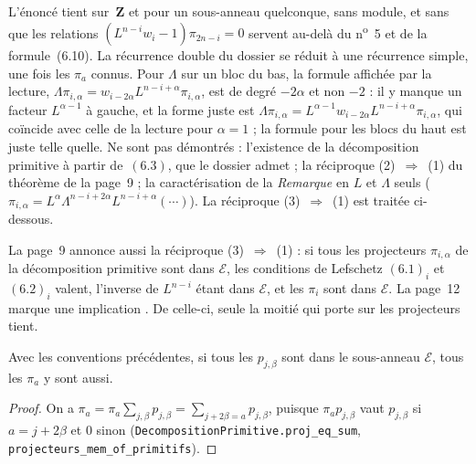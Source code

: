\begin{remarque}
L'énoncé tient sur~$\mathbf Z$ et pour un sous-anneau quelconque, sans module, et sans que les relations $(L^{n-i}w_i - 1)\pi_{2n-i} = 0$ servent au-delà du n\textsuperscript{o}~5 et de la formule~(6.10). La récurrence double du dossier se réduit à une récurrence simple, une fois les $\pi_a$ connus. Pour $\Lambda$ sur un bloc du bas, la formule affichée par la lecture, $\Lambda\pi_{i,\alpha} = w_{i-2\alpha}L^{n-i+\alpha}\pi_{i,\alpha}$, est de degré $-2\alpha$ et non $-2$ : il y manque un facteur $L^{\alpha-1}$ à gauche, et la forme juste est $\Lambda\pi_{i,\alpha} = L^{\alpha-1} w_{i-2\alpha} L^{n-i+\alpha}\pi_{i,\alpha}$, qui coïncide avec celle de la lecture pour $\alpha = 1$ ; la formule pour les blocs du haut est juste telle quelle. Ne sont pas démontrés : l'existence de la décomposition primitive à partir de~$(6.3)$, que le dossier admet ; la réciproque (2)~$\Rightarrow$~(1) du théorème de la page~9 ; la caractérisation de la \emph{Remarque} en $L$ et $\Lambda$ seuls ($\pi_{i,\alpha} = L^{\alpha}\Lambda^{n-i+2\alpha}L^{n-i+\alpha}(\cdots)$). La réciproque (3)~$\Rightarrow$~(1) est traitée ci-dessous.
\end{remarque}

La page~9 annonce aussi la réciproque (3)~$\Rightarrow$~(1) : si tous les projecteurs $\pi_{i,\alpha}$ de la décomposition primitive sont dans $\mathcal E$, les conditions de Lefschetz $(6.1)_i$ et $(6.2)_i$ valent, l'inverse de $L^{n-i}$ étant dans $\mathcal E$, et les $\pi_i$ sont dans $\mathcal E$. La page~12 marque une implication . De celle-ci, seule la moitié qui porte sur les projecteurs tient.

\begin{enonce}
Avec les conventions précédentes, si tous les $p_{j,\beta}$ sont dans le sous-anneau $\mathcal E$, tous les $\pi_a$ y sont aussi.
\end{enonce}

\begin{proof}
On a $\pi_a = \pi_a \sum_{j,\beta} p_{j,\beta} = \sum_{j + 2\beta = a} p_{j,\beta}$, puisque $\pi_a p_{j,\beta}$ vaut $p_{j,\beta}$ si $a = j + 2\beta$ et $0$ sinon (\texttt{DecompositionPrimitive.\allowbreak{}proj\_eq\_sum}, \texttt{projecteurs\_mem\_of\_primitifs}).
\end{proof}

